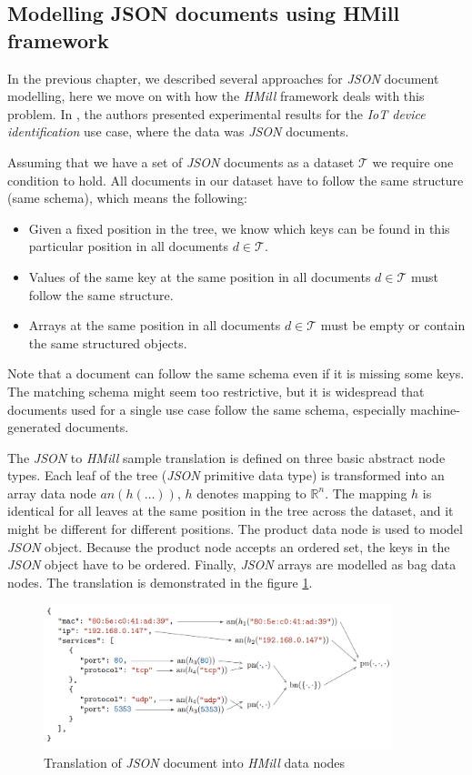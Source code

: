 \subsection{Modelling JSON documents using HMill framework}
In the previous chapter, we described several approaches for \emph{JSON} document modelling, here we move on with how the \emph{HMill} framework deals with this problem. In \cite{Mandlik2020}, the authors presented experimental results for the \emph{IoT device identification} use case, where the data was \emph{JSON} documents.

Assuming that we have a set of \emph{JSON} documents as a dataset $\mathcal{T}$ we require one condition to hold. All documents in our dataset have to follow the same structure (same schema), which means the following:
\begin{itemize}
    \itemsep0em 
    \item Given a fixed position in the tree, we know which keys can be found in this particular position in all documents $d\in\mathcal{T}$.
    \item Values of the same key at the same position in all documents $d\in\mathcal{T}$ must follow the same structure.
    \item Arrays at the same position in all documents $d\in\mathcal{T}$ must be empty or contain the same structured objects.
\end{itemize}

Note that a document can follow the same schema even if it is missing some keys. The matching schema might seem too restrictive, but it is widespread that documents used for a single use case follow the same schema, especially machine-generated documents.

The \emph{JSON} to \emph{HMill} sample translation is defined on three basic abstract node types. Each leaf of the tree (\emph{JSON} primitive data type) is transformed into an array data node $an(h(\dots))$, $h$ denotes mapping to $\mathbb{R}^n$. The mapping $h$ is identical for all leaves at the same position in the tree across the dataset, and it might be different for different positions. The product data node is used to model \emph{JSON} object. Because the product node accepts an ordered set, the keys in the \emph{JSON} object have to be ordered. Finally, \emph{JSON} arrays are modelled as bag data nodes. The translation is demonstrated in the figure \ref{fig:jsonhmill}.

\begin{figure}[h]
    \centering
    \includegraphics[width=0.9\textwidth]{figures/translation.png}
    \caption{Translation of \emph{JSON} document into \emph{HMill} data nodes \cite{Mandlik2020}}
    \label{fig:jsonhmill}
\end{figure}

